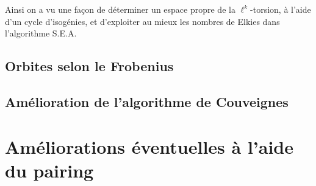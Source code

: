 \documentclass[10pt,a4paper]{book}
\theoremstyle{plain}
\theoremstyle{definition}
\theoremstyle{definition}
\theoremstyle{definition}
\theoremstyle{definition}
\theoremstyle{remark}
\theoremstyle{remark}
\theoremstyle{definition}
\begin{document}
Ainsi on a vu une façon de déterminer un espace propre de la $\ell^k$-torsion, à l'aide d'un cycle d'isogénies, et d'exploiter au mieux les nombres de Elkies dans l'algorithme S.E.A. 

\subsection{Orbites selon le Frobenius}
\subsection{Amélioration de l'algorithme de Couveignes}

\section{Améliorations éventuelles à l'aide du pairing}
\end{document}
